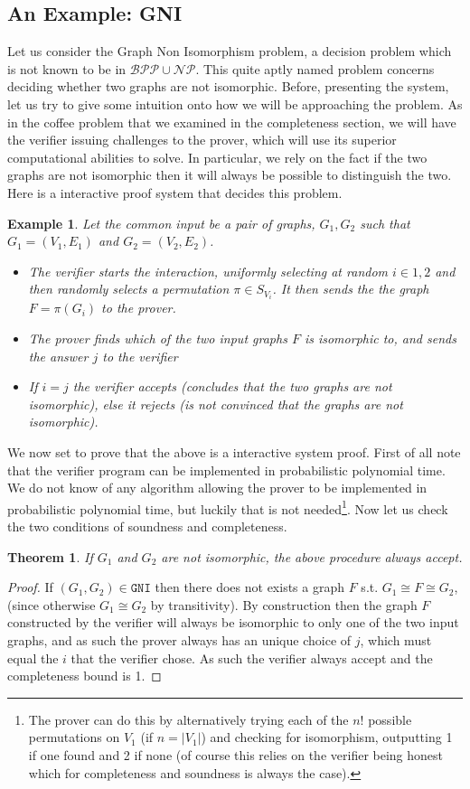 \documentclass{article}
\newtheorem{theorem}{Theorem}
\newtheorem{example}{Example}
\begin{document}
\subsection{An Example: GNI}
Let us consider the Graph Non Isomorphism problem, a decision problem which is not known to be in $\mathcal{BPP} \cup \mathcal{NP}$. This quite aptly named problem concerns deciding whether two graphs are not isomorphic.
Before, presenting the system, let us try to give some intuition onto how we will be approaching the problem. As in the coffee problem that we examined in the completeness section, we will have the verifier issuing challenges to the prover, which will use its superior computational abilities to solve. In particular, we rely on the fact if the two graphs are not isomorphic then it will always be possible to distinguish the two. 
Here is a interactive proof system that decides this problem.
\begin{example}
Let the common input be a pair of graphs, $G_1, G_2$ such that $G_1 = (V_1, E_1)$ and $G_2 = (V_2, E_2)$.
\begin{itemize}
    
    \item The verifier starts the interaction, uniformly selecting at random $i \in {1, 2}$ and then randomly selects a permutation $\pi \in S_{V_i}$.
          It then sends the the graph $F = \pi(G_i)$ to the prover.
    \item The prover finds which of the two input graphs $F$ is isomorphic to, and sends the answer $j$ to the verifier
    \item If $i = j$ the verifier accepts (concludes that the two graphs are not isomorphic), else it rejects (is not convinced that the graphs are not isomorphic). 
\end{itemize}
\end{example}

We now set to prove that the above is a interactive system proof. First of all note that the verifier program can be implemented in probabilistic polynomial time. We do not know of any algorithm allowing the prover to be implemented in probabilistic polynomial time, but luckily that is not needed\footnote{The prover can do this by alternatively trying each of the $n!$ possible permutations on $V_1$ (if $n = |V_1|$) and checking for isomorphism, outputting 1 if one found and 2 if none (of course this relies on the verifier being honest which for completeness and soundness is always the case). }. Now let us check the two conditions of soundness and completeness. 
\begin{theorem}
If $G_1$ and $G_2$ are not isomorphic, the above procedure always accept. 
\end{theorem}
\begin{proof}
If $(G_1, G_2) \in \texttt{GNI}$ then there does not exists a graph $F$ s.t. $G_1 \cong F \cong G_2$, (since otherwise $G_1 \cong G_2$ by transitivity). By construction then the graph $F$ constructed by the verifier will always be isomorphic to only one of the two input graphs, and as such the prover always has an unique choice of $j$, which must equal the $i$ that the verifier chose. As such the verifier always accept and the completeness bound is 1. 
\end{proof}
\end{document}
